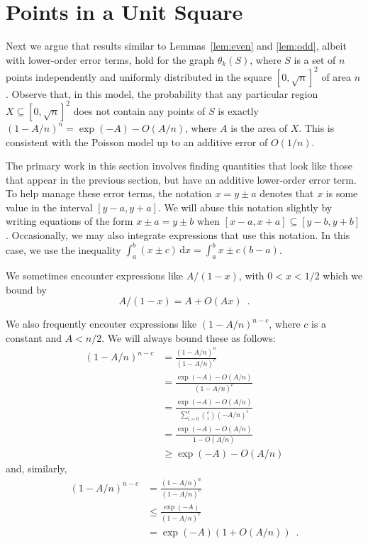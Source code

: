 \documentclass{patmorin}
\begin{document}
\section{Points in a Unit Square}

Next we argue that results similar to Lemmas~\ref{lem:even} and
\ref{lem:odd}, albeit with lower-order error terms, hold for the
graph $\theta_k(S)$, where $S$ is a set of $n$ points independently
and uniformly distributed in the square $[0,\sqrt{n}]^2$ of area $n$.
Observe that, in this model, the probability that any particular region
$X\subseteq [0,\sqrt{n}]^2$ does not contain any points of $S$ is exactly
$(1-A/n)^n=\exp(-A)-O(A/n)$, where $A$ is the area of $X$.  This is
consistent with the Poisson model up to an additive error of $O(1/n)$.

The primary work in this section involves finding quantities that look
like those that appear in the previous section, but have an additive
lower-order error term.  To help manage these error terms, the
notation $x= y\pm a$ denotes that $x$ is some value in the interval
$[y-a,y+a]$.  We will abuse this notation slightly by writing equations
of the form $x\pm a = y\pm b$ when $[x-a,x+a]\subseteq[y-b,y+b]$.
Occasionally, we may also integrate expressions that use this notation.
In this case, we use the inequality $\int_a^b (x\pm c)\,\mathrm{d}x =
\int_a^b x \pm c(b-a)$.

We sometimes encounter expressions like $A/(1-x)$, with $0<x<1/2$ which
we bound by
\[
   A/(1-x) = A+O(Ax) \enspace .
\]

We also frequently encouter expressions like $(1-A/n)^{n-c}$, where $c$
is a constant and $A < n/2$.  We will always bound these as follows:
\begin{align*}
   (1-A/n)^{n-c} 
      & = \frac{(1-A/n)^n}{(1-A/n)^c} \\
      & = \frac{\exp(-A)-O(A/n)}{(1-A/n)^c} \\
      & = \frac{\exp(-A)-O(A/n)}{\sum_{i=0}^c \binom{c}{i}(-A/n)^i} \\
      & = \frac{\exp(-A)-O(A/n)}{1-O(A/n)} \\
      & \ge \exp(-A) - O(A/n) 
\end{align*}
and, similarly, 
\begin{align*}
   (1-A/n)^{n-c} 
      & = \frac{(1-A/n)^n}{(1-A/n)^c} \\
      & \le \frac{\exp(-A)}{(1-A/n)^c} \\
      & = \exp(-A)(1+O(A/n))  \enspace .
\end{align*}
\end{document}
